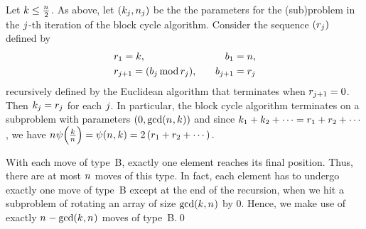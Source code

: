   \begin{lemma}\label{lemma.moves}
    Let $\Shift \leq \frac{\Size}{2}$. As above, let $(\Shift[\TheIndex],\Size[\TheIndex])$
    be the the parameters for the (sub)problem in the $\TheIndex$-th iteration of the block
    cycle algorithm. Consider the sequence $(\Remainder[\TheIndex])$ defined by
    \begin{align*}
      & \Remainder[1] = k, \quad  
      & \PrevRem[1] = n, \\
      & \Remainder[\TheIndex+1] = \inm{\PrevRem[\TheIndex]}{\Remainder[\TheIndex]} , \quad 
      & \PrevRem[\TheIndex+1]  = \Remainder[\TheIndex]
    \end{align*}
    recursively defined by the Euclidean algorithm
    that terminates when $\Remainder[\TheIndex+1] = 0$. Then $\Shift[\TheIndex]=\Remainder[\TheIndex]$ for each
    $\TheIndex$. In particular,  
        the block cycle algorithm terminates on a
        subproblem with parameters $(0,\gcd(\Size,\Shift))$ and 
        since $\Shift[1]+\Shift[2]+\cdots = \Remainder[1]+\Remainder[2]+\cdots$, we have 
        $
        \Size\EssentialCostOf{\frac{\Shift}{\Size}}
        =
        \EssentialCostOf{\Size,\Shift}
        =
        2\Parentheses{\Remainder[1]+\Remainder[2]+\cdots}
        .
        $
  \end{lemma}

  \begin{observation}
    With each move of type~B, exactly one element reaches its final
    position.  Thus, there are at most $\Size$ moves of this type. In
    fact, each element has to undergo exactly one move of type~B except at
    the end of the recursion, when we hit a subproblem of rotating an
    array of size $\gcd(\Shift,\Size)$ by $0$. Hence, we make use of
    exactly $\Size - \gcd(\Shift,\Size)$ moves of type~B.\qed
  \end{observation}
  
